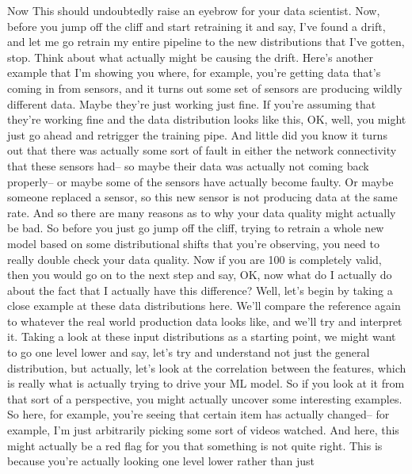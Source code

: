 {{{{{{{{    Now This should undoubtedly raise an eyebrow for your data scientist.
    Now, before you jump off the cliff and start retraining it
    and say, I've found a drift, and let me go
    retrain my entire pipeline to the new distributions that I've gotten, stop.
    Think about what actually might be causing the drift.
    Here's another example that I'm showing you where, for example, you're
    getting data that's coming in from sensors,
    and it turns out some set of sensors are producing wildly different data.
    Maybe they're just working just fine.
    If you're assuming that they're working fine
    and the data distribution looks like this,
    OK, well, you might just go ahead and retrigger the training pipe.
    And little did you know it turns out that there was actually
    some sort of fault in either the network connectivity that these sensors had--
    so maybe their data was actually not coming back properly--
    or maybe some of the sensors have actually become faulty.
    Or maybe someone replaced a sensor, so this new sensor is not
    producing data at the same rate.
    And so there are many reasons as to why your data quality might actually
    be bad.
    So before you just go jump off the cliff,
    trying to retrain a whole new model based on some distributional shifts
    that you're observing, you need to really double check your data quality.
    Now if you are 100%
    is completely valid, then you would go on to the next step and say, OK, now
    what do I actually do about the fact that I actually have this difference?
    Well, let's begin by taking a close example at these data distributions
    here.
    We'll compare the reference again to whatever the real world production
    data looks like, and we'll try and interpret it.
    Taking a look at these input distributions as a starting point,
    we might want to go one level lower and say, let's try
    and understand not just the general distribution,
    but actually, let's look at the correlation between the features, which
    is really what is actually trying to drive your ML model.
    So if you look at it from that sort of a perspective,
    you might actually uncover some interesting examples.
    So here, for example, you're seeing that certain item has actually changed--
    for example, I'm just arbitrarily picking some sort of videos watched.
    And here, this might actually be a red flag for you
    that something is not quite right.
    This is because you're actually looking one level lower rather than just
}}}}}}}}
